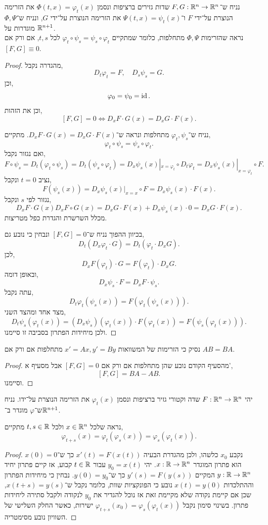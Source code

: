 \subquestion{}
נניח ש־$F, G : \mathbb{R}^n \to \mathbb{R}^n$ שדות גזירים ברציפות ונסמן $\Phi(t, x) = \varphi_t(x)$ את הזרימה הנוצרת על־ידי $F$ ו־$\Psi(t, x) = \psi_t(x)$ את הזרימה הנוצרת על־ידי $G$, ונניח ש־$\Phi, \Psi$ מוגדרות על $\mathbb{R}^{n + 1}$. \\
נראה שהזרימות $\Phi, \Psi$ מתחלפות, כלומר שמתקיים $\varphi_t \circ \psi_s = \psi_s \circ \varphi_t$ לכל $t, s$, אם ורק אם $[F, G] \equiv 0$.
\begin{proof}
	מהגדרה נקבל,
	\[
		D_t \varphi_t = F,
		\quad
		D_s \psi_s = G
	.\]
	וכן,
	\[
		\varphi_0 = \psi_0 = \operatorname{id}
	.\]
	וכן את הזהות,
	\[
		[F, G] = 0
		\iff D_x F \cdot G(x) = D_x G \cdot F(x)
	.\]

	נניח ש־$\varphi_t, \psi_s$ מתחלפות ונראה ש־$D_x F \cdot G(x) = D_x G \cdot F(x)$.
	מתקיים,
	\[
		\varphi_t \circ \psi_s
		= \psi_s \circ \varphi_t
	.\]
	ואם נגזור נקבל,
	\[
		F \circ \psi_s
		= D_t (\varphi_t \circ \psi_s)
		= D_t (\psi_s \circ \varphi_t)
		= D_x \psi_s(x) |_{x = \varphi_t} \circ D_t \varphi_t
		= D_x \psi_s(x) |_{x = \varphi_t} \circ F
	.\]
	נציב $t = 0$ ונקבל,
	\[
		F(\psi_s(x))
		= D_x \psi_s(x) |_{x = x} \circ F
		= D_x \psi_s(x) \cdot F(x)
	.\]
	נגזור לפי $s$ ונקבל,
	\[
		D_x F \cdot G(x)
		D_x F \circ G(x)
		= D_x G \cdot F(x) + D_x \psi_s(x) \cdot 0
		= D_x G \cdot F(x)
	.\]
	מכלל השרשרת והגדרת כפל מטריצות.

	בכיוון ההפוך נניח ש־$[F, G] = 0$ ונבחין כי נובע גם,
	\[
		D_t (D_x \varphi_t \cdot G)
		= D_t (\varphi_t \cdot D_x G)
	.\]
	לכן,
	\[
		D_x F(\varphi_t) \cdot G
		= F(\varphi_t) \cdot D_x G
	.\]
	ובאופן דומה,
	\[
		D_x \psi_s \cdot F
		= D_x F \cdot \psi_s
	.\]
	עתה נקבל,
	\[
		D_t \varphi_t(\psi_s(x))
		= F(\varphi_t(\psi_s(x)))
	.\]
	מצד אחד ומהצד השני,
	\[
		D_t \psi_s(\varphi_t(x))
		= (D_x \psi_s)(\varphi_t(x)) \cdot F(\varphi_t(x))
		= F(\psi_s(\varphi_t(x)))
	.\]
	ולכן מיחידות הפתרון בסביבה זו סיימנו.
\end{proof}

\subquestion{}
נסיק כי הזרימות של המשוואות $x' = Ax, y' = By$ מתחלפות אם ורק אם $AB = BA$.
\begin{proof}
	מהסעיף הקודם נובע שהן מתחלפות אם ורק אם $[F, G] = 0$ אבל מסעיף א',
	\[
		[F, G]
		= BA - AB
	.\]
	וסיימנו.
\end{proof}

\question{}
יהי $F : \mathbb{R}^n \to \mathbb{R}^n$ שדה וקטורי גזיר ברציפות ונסמן $\varphi_t(x)$ את הזרימה הנוצרת על־ידו.
נניח ש־$\varphi$ מוגדר ב־$\mathbb{R}^{n + 1}$.

\subquestion{}
נראה שלכל $x \in \mathbb{R}^n$ ולכל $t, s \in \mathbb{R}$ מתקיים,
\[
	\varphi_{t + s}(x)
	= \varphi_t(\varphi_s(x))
	= \varphi_s(\varphi_t(x))
.\]
\begin{proof}
	נקבע $x_0$ כלשהו, ולכן מהגדרת הבעיה $x'(t) = F(x(t))$ כך ש־$x(0) = 0$ הוא פתרון המוגדר $x : \mathbb{R} \to \mathbb{R}^n$.
	יהי $y_0 = x(t)$ עבור $t \in \mathbb{R}$ קבוע, אז קיים פתרון יחיד $y : \mathbb{R} \to \mathbb{R}^n$ המקיים $y'(s) = F(y(s))$ כך ש־$y(0) = y_0$.
	נבחין כי מיחידות הפתרון וההתלכדות $x(t) = y(0)$ נובע כי הפונקציות שוות, כלומר נקבל ש־$x(t + s) = y(s)$, שכן אם קיימת נקודה שלא מקיימת זאת אז נוכל להגדיר את $y_0$ לנקודה ולקבל סתירה ליחידות פתרון.
	בשינוי סימון נקבל $\varphi_{t + s}(x_0) = \varphi_s(\varphi_t(x))$ ישירות, כאשר החלק השלישי של השוויון נובע מסימטריה.
\end{proof}

